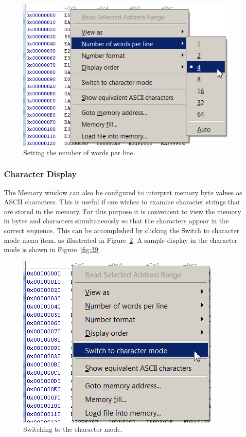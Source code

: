 \documentclass[11pt, twoside, pdftex]{article}
\begin{document}
\begin{figure}[H]
   \begin{center}
      \includegraphics[scale=1]{screenshots/figure37.png}
   \end{center}
   \caption{Setting the number of words per line.} 
	 \label{fig:37}
\end{figure}


\clearpage
\subsubsection{Character Display}
\label{sec:9.2.1}

The \textsf{Memory} window can also be configured to interpret
memory byte values as ASCII characters. 
This is useful if one wishes to examine character strings that 
are stored in the memory.
For this purpose it is convenient to view
the memory in bytes and characters simultaneously so that the
characters appear in the correct sequence. This can be
accomplished by clicking the {\sf Switch to character mode} menu
item, as illustrated in Figure~\ref{fig:38}. A sample display in the
character mode is shown in Figure~\ref{fig:39}.
  
\begin{figure}[H]
   \begin{center}
      \includegraphics[scale=1]{screenshots/figure38.png}
   \end{center}
   \caption{Switching to the character mode.}
	 \label{fig:38}
\end{figure}
\end{document}
